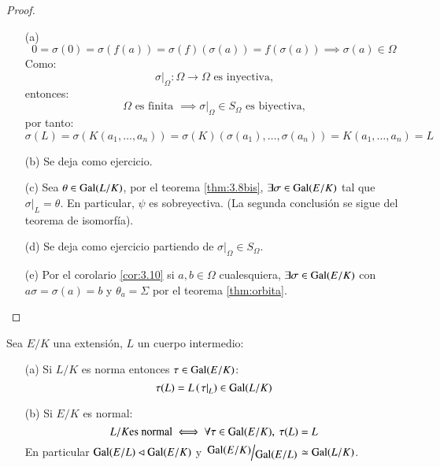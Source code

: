 \begin{proof}$ $
    \begin{itemize}
        \item[(a)]
        $$
            0 = \sigma(0) = \sigma(f(a)) = \sigma(f)(\sigma(a)) = f(\sigma(a)) \implies \sigma(a) \in \Omega
        $$
        Como:
        $$
            \left. \sigma \right|_\Omega: \Omega \to \Omega \text{ es inyectiva,}
        $$
        entonces:
        $$
            \Omega \text{ es finita } \implies \left. \sigma \right|_\Omega \in S_\Omega \text{ es biyectiva,}
        $$
        por tanto:
        $$
            \sigma(L) = \sigma(K(a_1, \ldots, a_n)) = \sigma(K)(\sigma(a_1), \ldots, \sigma(a_n)) = K(a_1, \ldots, a_n) = L
        $$
        \item[(b)] Se deja como ejercicio.
        \item[(c)] Sea $\theta \in \mathrm{Gal}(L/K)$, por el teorema \ref{thm:3.8bis}, $\exists \sigma \in \mathrm{Gal}(E/K)$ tal que $\left. \sigma \right|_L = \theta$. En particular, $\psi$ es sobreyectiva. (La segunda conclusión se sigue del teorema de isomorfía).
        \item[(d)] Se deja como ejercicio partiendo de $\left. \sigma \right|_\Omega \in S_\Omega$.
        \item[(e)] Por el corolario \ref{cor:3.10} si $a, b \in \Omega$ cualesquiera, $\exists \sigma \in \mathrm{Gal}(E/K)$ con $a\sigma = \sigma(a) = b$ y $\theta_a = \Sigma$ por el teorema \ref{thm:orbita}.
    \end{itemize}
\end{proof}


\begin{cor}\label{cor:3.12}
    Sea $E/K$ una extensión, $L$ un cuerpo intermedio:
    \begin{itemize}
        \item[(a)] Si $L/K$ es norma entonces $\tau \in \mathrm{Gal}(E/K)$:
        $$
            \tau(L) = L \left(\left.\tau\right|_L\right) \in \mathrm{Gal}(L/K)
        $$
        \item[(b)] Si $E/K$ es normal:
        $$
            L/K \text{es normal} \iff \forall \tau \in \mathrm{Gal}(E/K),\ \tau(L) = L
        $$
        En particular $\mathrm{Gal}(E/L) \lhd \mathrm{Gal}(E/K)$ y $\quo{\gal(E/K)}{\gal(E/L)} \isom \gal(L/K)$.
    \end{itemize}
\end{cor}

